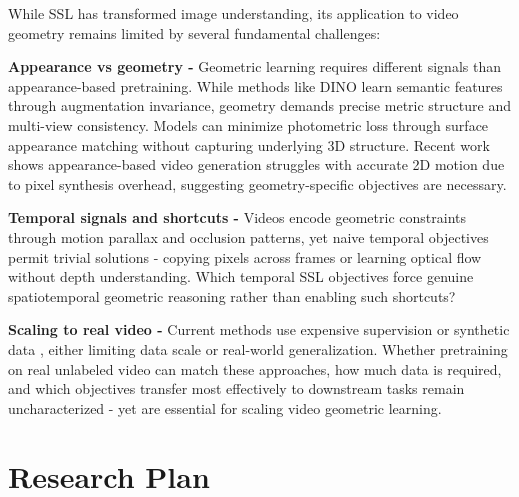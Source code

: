 \documentclass{article}
\begin{document}
While SSL has transformed image understanding, its application 
to video geometry remains limited by several fundamental challenges:


\textbf{Appearance vs geometry - }Geometric learning requires different signals than appearance-based pretraining. While methods like DINO learn semantic features through augmentation invariance, geometry demands precise metric structure and multi-view consistency. Models can minimize photometric loss through surface appearance matching without capturing underlying 3D structure. Recent work~\cite{motionpred} shows appearance-based video generation struggles with accurate 2D motion due to pixel synthesis overhead, suggesting geometry-specific objectives are necessary.

\textbf{Temporal signals and shortcuts - }Videos encode geometric constraints through motion parallax and occlusion patterns, yet naive temporal objectives permit trivial solutions - copying pixels across frames or learning optical flow without depth understanding. Which temporal SSL objectives force genuine spatiotemporal geometric reasoning rather than enabling such shortcuts?

\textbf{Scaling to real video - }Current methods use expensive supervision \cite{vggt} or synthetic data \cite{geo4d}, either limiting data scale or real-world generalization. Whether pretraining on real unlabeled video can match these approaches, how much data is required, and which objectives transfer most effectively to downstream tasks remain uncharacterized - yet are essential for scaling video geometric learning.

\section{Research Plan}
\end{document}
